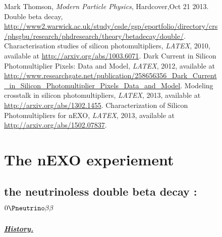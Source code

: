 \begin{figure}[!hbtp]
  
 

\begin{thebibliography}{999}
   Mark Thomson, \textit{Modern Particle Physics}, Hardcover,Oct 21 2013.
  Double beta decay, \url{http://www2.warwick.ac.uk/study/csde/gsp/eportfolio/directory/crs/phsgbu/research/phdresearch/theory/betadecay/double/}.
  Characterisation studies of silicon photomultipliers, {\em LATEX}, 2010, available at \url{http://arxiv.org/abs/1003.6071}.
  Dark Current in Silicon Photomultiplier Pixels: Data and Model, {\em LATEX}, 2012, available at \url{http://www.researchgate.net/publication/258656356_Dark_Current_in_Silicon_Photomultiplier_Pixels_Data_and_Model}.
  Modeling crosstalk in silicon photomultipliers, {\em LATEX}, 2013, available at \url{http://arxiv.org/abs/1302.1455}.
  Characterization of Silicon Photomultipliers for nEXO, {\em LATEX}, 2013, available at \url{http://arxiv.org/abs/1502.07837}. 
\end{thebibliography}


\appendix


\chapter{The nEXO experiement}\label{app:nEXO}
  
  
  \section{the neutrinoless double beta decay : \(0\Pneutrino\beta\beta\)}
  
  \paragraph{\underline{\emph{History.}}}
  

\end{figure}
